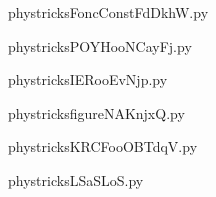 
    \newcommand{\CaptionFigFoncConstFdDkhW}{<+Type your caption here+>}
    \begin{center}
        
    \end{center}
    phystricksFoncConstFdDkhW.py

    

    \clearpage
    


    \newcommand{\CaptionFigPOYHooNCayFj}{<+Type your caption here+>}
    \begin{center}
        
    \end{center}
    phystricksPOYHooNCayFj.py

    

    \clearpage
    


    \newcommand{\CaptionFigIERooEvNjp}{<+Type your caption here+>}
    \begin{center}
        
    \end{center}
    phystricksIERooEvNjp.py

    

    \clearpage
    


    \newcommand{\CaptionFigfigureNAKnjxQ}{<+Type your caption here+>}
    \begin{center}
        
    \end{center}
    phystricksfigureNAKnjxQ.py

    

    \clearpage
    


    \newcommand{\CaptionFigKRCFooOBTdqV}{<+Type your caption here+>}
    \begin{center}
        
    \end{center}
    phystricksKRCFooOBTdqV.py

    

    \clearpage
    


    \newcommand{\CaptionFigLSaSLoS}{<+Type your caption here+>}
    \begin{center}
        
    \end{center}
    phystricksLSaSLoS.py

